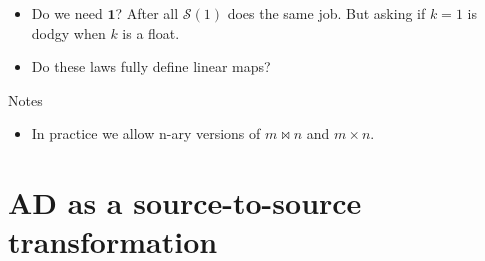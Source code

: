 \documentclass[sigplan,review]{acmart}
\newcommand{\lmvcat}{\times}         %
\newcommand{\lmhcat}{\bowtie}        %
\newcommand{\lmone}{\mathbf{1}}      %
\newcommand{\lmscalar}[1]{{\mathcal S}(#1)}      %
\newcommand{\simon}[1]{}
\newcommand{\awf}[1]{}
\begin{document}
\begin{itemize}
\item Do we need $\lmone$? After all $\lmscalar{1}$ does the same job.
  But asking if $k=1$ is dodgy when $k$ is a float. \awf{No, perfectly fine to ask if a
    float is 1 --- the nearby floats are far away, and there's no other float $f$ such that $\lmscalar f = \lmone$.}
  \simon{For the purposes of this paper I prefer having $\lmone$ as well; unity plays such a key role!}
\item Do these laws fully define linear maps?
\end{itemize}
Notes
\begin{itemize}
\item In practice we allow n-ary versions of $m \lmhcat n$ and $m \lmvcat n$.
\end{itemize}

\section{AD as a source-to-source transformation}
\end{document}
